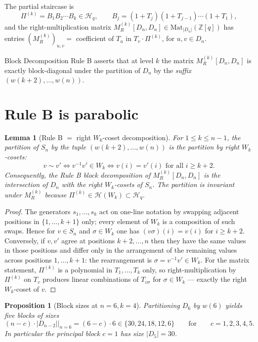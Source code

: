 \documentclass[11pt]{article}
\newtheorem{lemma}[theorem]{Lemma}
\newtheorem{proposition}[theorem]{Proposition}
\theoremstyle{definition}
\begin{document}
The partial staircase is
$$\Pi^{(k)} = B_1 B_2 \cdots B_k \in \mathcal{H}_q, \qquad
B_j = (1+T_j)(1+T_{j-1})\cdots(1+T_1),$$
and the right-multiplication matrix $M_R^{(k)}[D_n, D_n] \in \mathrm{Mat}_{|D_n|}(\mathbb{Z}[q])$
has entries $(M_R^{(k)})_{u,v} = $ coefficient of $T_u$ in $T_v \cdot \Pi^{(k)}$, for $u, v \in D_n$.

Block Decomposition Rule B \cite{memory:block-decomposition-rule-b} asserts that at
level $k$ the matrix $M_R^{(k)}[D_n, D_n]$ is exactly block-diagonal under the
partition of $D_n$ by the \emph{suffix} $(w(k+2), \ldots, w(n))$.

\section{Rule B is parabolic}

\begin{lemma}[Rule B $=$ right $W_k$-coset decomposition]\label{lem:rule-b-parabolic}
For $1 \le k \le n-1$, the partition of $S_n$ by the tuple $(w(k+2), \ldots, w(n))$
is the partition by right $W_k$-cosets:
$$v \sim v' \iff v^{-1} v' \in W_k \iff v(i) = v'(i) \text{ for all } i \ge k+2.$$
Consequently, the Rule B block decomposition of $M_R^{(k)}[D_n, D_n]$ is the
intersection of $D_n$ with the right $W_k$-cosets of $S_n$. The partition is invariant
under $M_R^{(k)}$ because $\Pi^{(k)} \in \mathcal{H}(W_k) \subset \mathcal{H}_q$.
\end{lemma}

\begin{proof}
The generators $s_1, \ldots, s_k$ act on one-line notation by swapping adjacent
positions in $\{1, \ldots, k+1\}$ only; every element of $W_k$ is a composition of
such swaps. Hence for $v \in S_n$ and $\sigma \in W_k$ one has $(v\sigma)(i) = v(i)$
for $i \ge k+2$. Conversely, if $v, v'$ agree at positions $k+2, \ldots, n$ then they
have the same values in those positions and differ only in the arrangement of the
remaining values across positions $1, \ldots, k+1$: the rearrangement is
$\sigma = v^{-1} v' \in W_k$. For the matrix statement, $\Pi^{(k)}$ is a polynomial in
$T_1, \ldots, T_k$ only, so right-multiplication by $\Pi^{(k)}$ on $T_v$ produces
linear combinations of $T_{v\sigma}$ for $\sigma \in W_k$ — exactly the right
$W_k$-coset of $v$.
\end{proof}

\begin{proposition}[Block sizes at $n=6, k=4$]\label{prop:block-sizes}
Partitioning $D_6$ by $w(6)$ yields five blocks of sizes
$$(n-c)\cdot|D_{n-2}|\Big|_{n=6} = (6-c)\cdot 6 \in \{30, 24, 18, 12, 6\}
\qquad\text{for}\qquad c = 1, 2, 3, 4, 5.$$
In particular the principal block $c=1$ has size $|D_5| = 30$.
\end{proposition}
\end{document}
